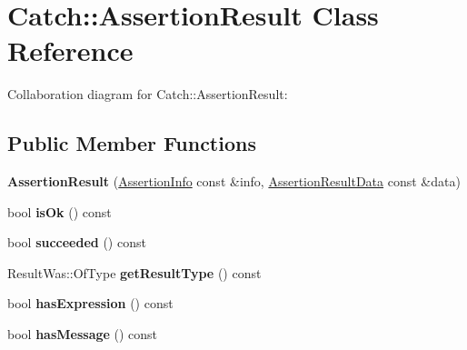 \hypertarget{class_catch_1_1_assertion_result}{}\section{Catch\+:\+:Assertion\+Result Class Reference}
\label{class_catch_1_1_assertion_result}


Collaboration diagram for Catch\+:\+:Assertion\+Result\+:
\subsection*{Public Member Functions}
\begin{DoxyCompactItemize}
\item 
\hypertarget{class_catch_1_1_assertion_result_ab58aeec27052ba400633ed0e36cea692}{}{\bfseries Assertion\+Result} (\hyperlink{struct_catch_1_1_assertion_info}{Assertion\+Info} const \&info, \hyperlink{struct_catch_1_1_assertion_result_data}{Assertion\+Result\+Data} const \&data)\label{class_catch_1_1_assertion_result_ab58aeec27052ba400633ed0e36cea692}

\item 
\hypertarget{class_catch_1_1_assertion_result_a70fb6aa62a38db3bdcafb4bb134afb21}{}bool {\bfseries is\+Ok} () const \label{class_catch_1_1_assertion_result_a70fb6aa62a38db3bdcafb4bb134afb21}

\item 
\hypertarget{class_catch_1_1_assertion_result_a5404062147930354afeb154de7cbaa7e}{}bool {\bfseries succeeded} () const \label{class_catch_1_1_assertion_result_a5404062147930354afeb154de7cbaa7e}

\item 
\hypertarget{class_catch_1_1_assertion_result_aa90bec8064879a62fcdc8e1079bcdba1}{}Result\+Was\+::\+Of\+Type {\bfseries get\+Result\+Type} () const \label{class_catch_1_1_assertion_result_aa90bec8064879a62fcdc8e1079bcdba1}

\item 
\hypertarget{class_catch_1_1_assertion_result_a45551f4f092c640ffce0cdd8a94f4b62}{}bool {\bfseries has\+Expression} () const \label{class_catch_1_1_assertion_result_a45551f4f092c640ffce0cdd8a94f4b62}

\item 
\hypertarget{class_catch_1_1_assertion_result_ab22a1c9baa182aeb2549fffeb8294d9e}{}bool {\bfseries has\+Message} () const \label{class_catch_1_1_assertion_result_ab22a1c9baa182aeb2549fffeb8294d9e}


\end{DoxyCompactItemize}
